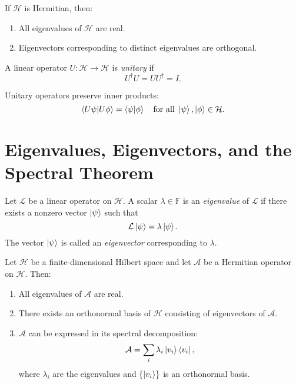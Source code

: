 	\begin{theorem}
		If \( \mathcal{H} \) is Hermitian, then:
		\begin{enumerate}
			\item All eigenvalues of \( \mathcal{H} \) are real.
			\item Eigenvectors corresponding to distinct eigenvalues are orthogonal.
		\end{enumerate}
	\end{theorem}
	
	\begin{definition}
		A linear operator \( U: \mathcal{H} \to \mathcal{H} \) is \emph{unitary} if
		\[
		U^\dagger U = U U^\dagger = I.
		\]
	\end{definition}
	
	\begin{remark}
		Unitary operators preserve inner products:
		\[
		\left\langle U\psi \middle| U\phi \right\rangle = \left\langle \psi \middle| \phi \right\rangle \quad \text{for all } \left| \psi \right\rangle,\left| \phi \right\rangle\in\mathcal{H}.
		\]
	\end{remark}
	
	\section{Eigenvalues, Eigenvectors, and the Spectral Theorem}
	\begin{definition}
		Let \( \mathcal{L} \) be a linear operator on \( \mathcal{H} \). A scalar \( \lambda \in \mathbb{F} \) is an \emph{eigenvalue} of \( \mathcal{L} \) if there exists a nonzero vector \( \left| \psi \right\rangle \) such that
		\[
		\mathcal{L}\left| \psi \right\rangle = \lambda \left| \psi \right\rangle.
		\]
		The vector \( \left| \psi \right\rangle \) is called an \emph{eigenvector} corresponding to \( \lambda \).
	\end{definition}
	
	\begin{theorem}
		Let \( \mathcal{H} \) be a finite-dimensional Hilbert space and let \( \mathcal{A} \) be a Hermitian operator on \( \mathcal{H} \). Then:
		\begin{enumerate}
			\item All eigenvalues of \( \mathcal{A} \) are real.
			\item There exists an orthonormal basis of \( \mathcal{H} \) consisting of eigenvectors of \( \mathcal{A} \).
			\item \( \mathcal{A} \) can be expressed in its spectral decomposition:
			\[
			\mathcal{A} = \sum_{i} \lambda_i \left| v_i \right\rangle\left\langle v_i \right|,
			\]
			where \( \lambda_i \) are the eigenvalues and \( \{ \left| v_i \right\rangle \} \) is an orthonormal basis.
		\end{enumerate}
	\end{theorem}
	
